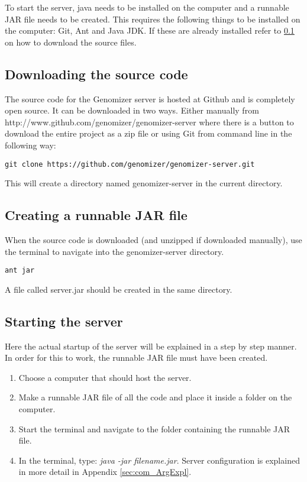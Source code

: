 To start the server, java needs to be installed on the computer and a runnable JAR file needs to be created.
This requires the following things to be installed on the computer: Git, Ant and Java JDK. 
If these are already installed refer to \ref{sec:com_download} on how to download the source files.

\subsection{Downloading the source code}\label{sec:com_download}

The source code for the Genomizer server is hosted at Github and is completely open source. It can be downloaded in
two ways. Either manually from http://www.github.com/genomizer/genomizer-server where there is a button to
download the entire project as a zip file or using Git from command line in the following way:
\begin{verbatim}
git clone https://github.com/genomizer/genomizer-server.git
\end{verbatim}
This will create a directory named genomizer-server in the current directory.

\subsection{Creating a runnable JAR file}\label{sec:com_makejar}

When the source code is downloaded (and unzipped if downloaded manually), use the terminal to navigate into
the genomizer-server directory.
\begin{verbatim}
ant jar
\end{verbatim}
A file called server.jar should be created in the same directory.


\subsection{Starting the server}
Here the actual startup of the server will be explained in a step by step manner.
In order for this to work, the runnable JAR file must have been created.
\begin{enumerate}
\item Choose a computer that should host the server.
\item Make a runnable JAR file of all the code and place it inside a folder on the computer.
\item Start the terminal and navigate to the folder containing the runnable JAR file.
\item In the terminal, type: \emph{java -jar filename.jar}. Server configuration is explained in more detail in Appendix \ref{sec:com_ArgExpl}.\\ 
\end{enumerate}
